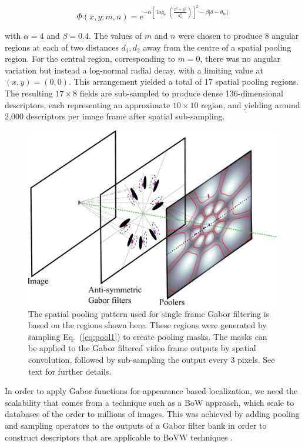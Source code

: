 \begin{equation}
\Phi(x,y;m,n) = e^{-\alpha \left [\log_e \left ( \frac{x^2+y^2}{d_n^2}\right ) \right ]^2 - \beta |\theta-\theta_m | }
\label{eq:pool1}
\end{equation}

\noindent with $\alpha = 4$ and $\beta = 0.4$. The values of $m$ and $n$ were chosen to produce 8 angular regions at each of two distances $d_1, d_2$ away from the centre of a spatial pooling region.  For the central region, corresponding to $m=0$, there was no angular variation but instead a log-normal radial decay, with a limiting value at $(x,y)=(0,0)$. This arrangement yielded a total of  17 spatial pooling regions. The resulting $17 \times 8$ fields are sub-sampled to produce dense 136-dimensional descriptors, each representing an approximate $10 \times 10$ region, and yielding around 2,000 descriptors per image frame after spatial sub-sampling. 

\begin{figure}[t]
\centering
\includegraphics[width=0.7\linewidth]{./gfx/Chapter04/Layers.pdf}
\caption{The spatial pooling pattern used for single frame Gabor filtering is based on the regions shown here.  These regions were generated by sampling Eq.~(\ref{eq:pool1}) to create pooling masks. The masks can be applied to the Gabor filtered video frame outputs by spatial convolution, followed by sub-sampling the output every 3 pixels. See text for further details.}
\label{fig:IsoPool}
\end{figure}



In order to apply Gabor functions for appearance based localization, we need the scalability that comes from a technique such as a BoW approach, which scale to databases of the order to millions of images. This was achieved by adding pooling and sampling operators to the outputs of a Gabor filter bank in order to construct descriptors that are applicable to BoVW techniques \citep{nister2006scalable}.  

